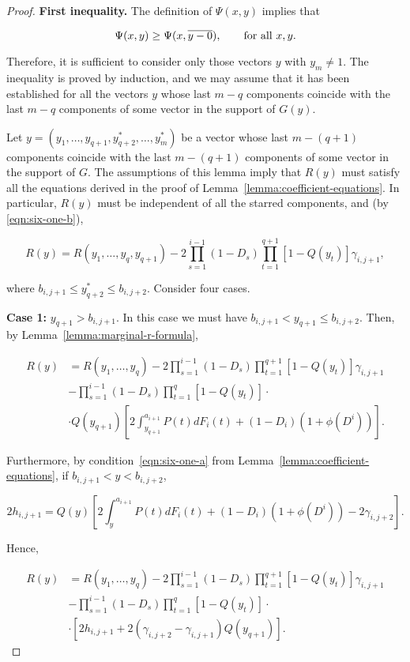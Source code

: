 \documentclass{article}
\theoremstyle{remark}
\begin{document}
\begin{proof}

\textbf{First inequality.} The definition of $\Psi(x, y)$ implies that

\[
\Psi(x, y) \geq \Psi(x, \overline{y-0}), \qquad \textup{for all } x, y.
\]

Therefore, it is sufficient to consider only those vectors $y$ with $y_m \neq
1$. The inequality is proved by induction, and we may assume that it has been
established for all the vectors $y$ whose last $m-q$ components coincide with
the last $m-q$ components of some vector in the support of $G(y)$.

Let $y = (y_1, \dots, y_{q+1}, y^*_{q+2}, \dots, y^*_m)$ be a vector whose last
$m - (q+1)$ components coincide with the last $m - (q+1)$ components of some
vector in the support of $G$. The assumptions of this lemma imply that $R(y)$
must satisfy all the equations derived in the proof of
Lemma~\ref{lemma:coefficient-equations}. In particular, $R(y)$ must be
independent of all the starred components, and (by \ref{eqn:six-one-b}),

\[
R(y) = R(y_1, \dots, y_q, y_{q+1})
 - 2 \prod_{s=1}^{i-1}(1-D_s)
\prod_{t=1}^{q+1} [1 - Q(y_t)] \gamma_{i, j+1},
\]

where $b_{i, j+1} \leq y^*_{q+2} \leq b_{i, j+2}$. Consider four cases.

\textbf{Case 1:} $y_{q+1} > b_{i, j+1}$. In this case we must have $b_{i, j+1}
< y_{q+1} \leq b_{i, j+2}$. Then, by Lemma~\ref{lemma:marginal-r-formula},

\begin{align*}
R(y)
&= R(y_1, \dots, y_q) - 2 \prod_{s=1}^{i-1}(1-D_s)
\prod_{t=1}^{q+1} [1 - Q(y_t)] \gamma_{i, j+1} \\
&- \prod_{s=1}^{i-1}(1-D_s) \prod_{t=1}^{q} [1 - Q(y_t)] \cdot  \\
& \cdot Q(y_{q+1}) \left [
    2 \int_{y_{q+1}}^{a_{i+1}} P(t) dF_i(t) + (1-D_i)(1+\phi(D^i))
\right ].
\end{align*}

Furthermore, by condition~\ref{eqn:six-one-a} from
Lemma~\ref{lemma:coefficient-equations}, if $b_{i, j+1} < y < b_{i, j+2}$,

\[
2h_{i, j+1} = Q(y) \left [
  2 \int_{y}^{a_{i+1}} P(t) dF_i(t) + (1-D_i)(1+\phi(D^i)) - 2 \gamma_{i, j+2}
\right ].
\]

Hence,

\begin{align*}
R(y)
&= R(y_1, \dots, y_q) - 2 \prod_{s=1}^{i-1}(1-D_s)
\prod_{t=1}^{q+1} [1 - Q(y_t)] \gamma_{i, j+1} \\
&- \prod_{s=1}^{i-1}(1-D_s) \prod_{t=1}^{q} [1 - Q(y_t)] \cdot  \\
& \cdot \left [
2h_{i, j+1} + 2(\gamma_{i, j+2} - \gamma_{i, j+1})Q(y_{q+1})
\right ].
\end{align*}


\end{proof}
\end{document}
